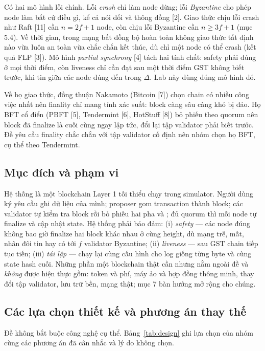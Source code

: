 \documentclass[a4paper,12pt]{article}
\newcommand{\code}[1]{\texttt{\detokenize{#1}}}
\begin{document}
Có hai mô hình lỗi chính. Lỗi \emph{crash} chỉ làm node dừng; lỗi \emph{Byzantine} cho phép node làm
bất cứ điều gì, kể cả nói dối và thông đồng [2]. Giao thức chịu lỗi crash như Raft [11] cần $n = 2f+1$ node,
còn chịu lỗi Byzantine cần $n \ge 3f+1$ (mục 5.4). Về thời gian, trong mạng bất đồng bộ hoàn toàn không
giao thức tất định nào vừa luôn an toàn vừa chắc chắn kết thúc, dù chỉ một node có thể crash (kết quả FLP
[3]). Mô hình \emph{partial synchrony} [4] tách hai tính chất: safety phải đúng ở mọi thời điểm, còn
liveness chỉ cần đạt sau một thời điểm GST không biết trước, khi tin giữa các node đúng đến trong $\Delta$.
Lab này dùng đúng mô hình đó.

Về họ giao thức, đồng thuận Nakamoto (Bitcoin [7]) chọn chain có nhiều công việc nhất nên finality chỉ
mang tính xác suất: block càng sâu càng khó bị đảo. Họ BFT cổ điển (PBFT [5], Tendermint [6], HotStuff
[8]) bỏ phiếu theo quorum nên block đã finalize là cuối cùng ngay lập tức, đổi lại tập validator phải biết
trước. Đề yêu cầu finality chắc chắn với tập validator cố định nên nhóm chọn họ BFT, cụ thể theo Tendermint.

\subsection{Mục đích và phạm vi}
Hệ thống là một blockchain Layer 1 tối thiểu chạy trong simulator. Người dùng ký yêu cầu ghi dữ liệu của
mình; proposer gom transaction thành block; các validator tự kiểm tra block rồi bỏ phiếu hai pha
\code{PREVOTE} và \code{PRECOMMIT}; đủ quorum \code{PRECOMMIT} thì mỗi node tự finalize và cập nhật state.
Hệ thống phải bảo đảm: (i) \emph{safety} --- các node đúng không bao giờ finalize hai block khác nhau ở
cùng height, dù mạng trễ, mất, nhân đôi tin hay có tới $f$ validator Byzantine; (ii) \emph{liveness} ---
sau GST chain tiếp tục tiến; (iii) \emph{tái lập} --- chạy lại cùng cấu hình cho log giống từng byte và
cùng state hash cuối. Những phần một blockchain thật cần nhưng nằm ngoài đề và \emph{không} được hiện
thực gồm: token và phí, máy ảo và hợp đồng thông minh, thay đổi tập validator, lưu trữ bền, mạng thật;
mục 7 bàn hướng mở rộng cho chúng.

\subsection{Các lựa chọn thiết kế và phương án thay thế}
Đề không bắt buộc công nghệ cụ thể. Bảng~\ref{tab:design} ghi lựa chọn của nhóm cùng các phương án đã
cân nhắc và lý do không chọn.
\end{document}
